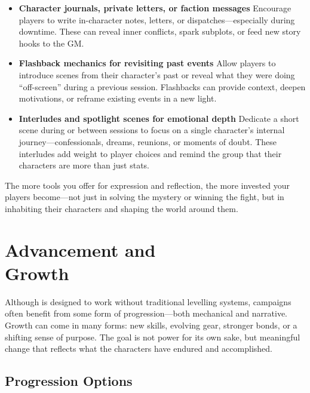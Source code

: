 \begin{itemize}
    \item \textbf{Character journals, private letters, or faction messages}  
    Encourage players to write in-character notes, letters, or dispatches—especially during downtime. These can reveal inner conflicts, spark subplots, or feed new story hooks to the GM.

    \item \textbf{Flashback mechanics for revisiting past events}  
    Allow players to introduce scenes from their character’s past or reveal what they were doing “off-screen” during a previous session. Flashbacks can provide context, deepen motivations, or reframe existing events in a new light.

    \item \textbf{Interludes and spotlight scenes for emotional depth}  
    Dedicate a short scene during or between sessions to focus on a single character’s internal journey—confessionals, dreams, reunions, or moments of doubt. These interludes add weight to player choices and remind the group that their characters are more than just stats.
\end{itemize}

The more tools you offer for expression and reflection, the more invested your players become—not just in solving the mystery or winning the fight, but in inhabiting their characters and shaping the world around them.





\section[Advancement and Growth]{Advancement and\\ Growth}

Although \wyrd is designed to work without traditional levelling systems, campaigns often benefit from some form of progression—both mechanical and narrative. Growth can come in many forms: new skills, evolving gear, stronger bonds, or a shifting sense of purpose. The goal is not power for its own sake, but meaningful change that reflects what the characters have endured and accomplished.

\subsection*{Progression Options}

